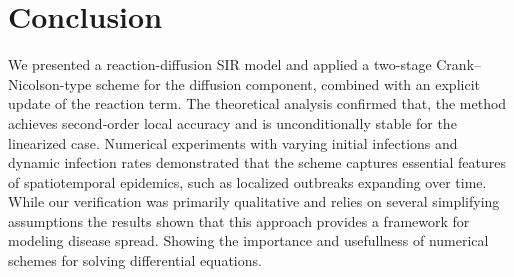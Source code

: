 \section{Conclusion}
We presented a reaction-diffusion SIR model and applied a two-stage Crank--Nicolson-type scheme for the 
diffusion component, combined with an explicit update of the reaction term. The theoretical analysis confirmed 
that, the method achieves second-order local accuracy and 
is unconditionally stable for the linearized case. Numerical experiments with varying initial infections and 
dynamic infection rates demonstrated that the scheme captures essential features of spatiotemporal epidemics, 
such as localized outbreaks expanding over time. While our verification was primarily qualitative and relies
on several simplifying assumptions the results shown that this approach provides a framework for 
modeling disease spread. Showing the importance and usefullness of numerical schemes for solving 
differential equations.

